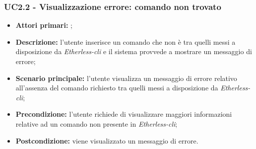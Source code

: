 \subsubsection{UC2.2 - Visualizzazione errore: comando non trovato}
\begin{itemize}
	\item \textbf{Attori primari:} \ug{};
	\item \textbf{Descrizione:} l’utente inserisce un comando che non è tra quelli messi a disposizione da \textit{Etherless-cli} e il sistema provvede a mostrare un messaggio di errore;  
	\item \textbf{Scenario principale:} l’utente visualizza un messaggio di errore relativo all’assenza del comando richiesto tra quelli messi a disposizione da \textit{Etherless-cli}; 
	\item \textbf{Precondizione:} l’utente richiede di visualizzare maggiori informazioni relative ad un comando non presente in \textit{Etherless-cli};  
	\item \textbf{Postcondizione:} viene visualizzato un messaggio di errore. 
\end{itemize}